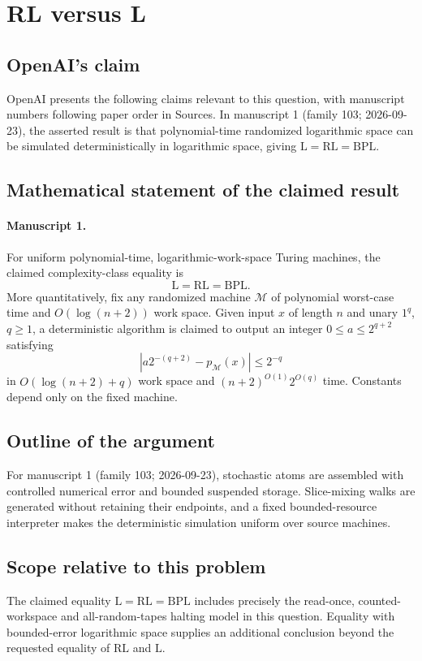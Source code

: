 \documentclass[11pt]{article}
\begin{document}
\section*{RL versus L}

\subsection{OpenAI's claim}
OpenAI presents the following claims relevant to this question, with manuscript numbers following paper order in Sources. In manuscript 1 (family 103; 2026-09-23), the asserted result is that polynomial-time randomized logarithmic space can be simulated deterministically in logarithmic space, giving $\mathrm L=\mathrm{RL}=\mathrm{BPL}$.

\subsection{Mathematical statement of the claimed result}
\paragraph{Manuscript 1.}
For uniform polynomial-time, logarithmic-work-space Turing machines, the claimed complexity-class equality is
\[
 \mathrm L=\mathrm{RL}=\mathrm{BPL}.
\]
More quantitatively, fix any randomized machine $\mathcal M$ of polynomial worst-case time and $O(\log(n+2))$ work space. Given input $x$ of length $n$ and unary $1^q$, $q\ge1$, a deterministic algorithm is claimed to output an integer $0\le a\le2^{q+2}$ satisfying
\[
 |a2^{-(q+2)}-p_{\mathcal M}(x)|\le2^{-q}
\]
in $O(\log(n+2)+q)$ work space and $(n+2)^{O(1)}2^{O(q)}$ time. Constants depend only on the fixed machine.

\subsection{Outline of the argument}
For manuscript 1 (family 103; 2026-09-23), stochastic atoms are assembled with controlled numerical error and bounded suspended storage. Slice-mixing walks are generated without retaining their endpoints, and a fixed bounded-resource interpreter makes the deterministic simulation uniform over source machines.

\subsection{Scope relative to this problem}
The claimed equality $\mathrm L=\mathrm{RL}=\mathrm{BPL}$ includes precisely the read-once, counted-workspace and all-random-tapes halting model in this question. Equality with bounded-error logarithmic space supplies an additional conclusion beyond the requested equality of $\mathrm{RL}$ and $\mathrm L$.
\end{document}
